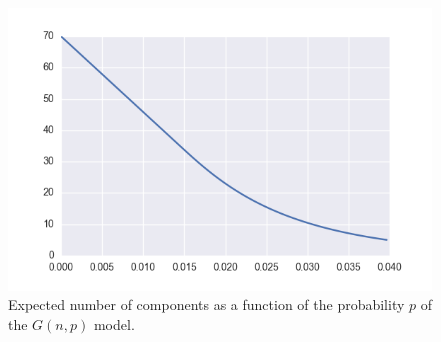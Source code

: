 \begin{figure}[hb]
	\centering
	\includegraphics[scale=0.8]{figures/gnp_number_components.png}
	\caption{Expected number of components as a function of the probability $p$ of the $G(n,p)$ model.}
	\label{fig:gnp_number_components}
\end{figure}










